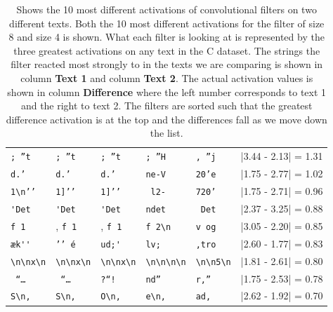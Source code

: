 \begin{table}
\begin{tabular}{lll|lll}
        \verb[; ”t[       & \verb[; ”t[       & \verb[; ”t[          &
        \verb'; ”H'       & \verb', ”j'       & |3.44 - 2.13| = 1.31 \\

        \verb[d.’ [       & \verb[d.’ [       & \verb[d.’ [          &
        \verb'ne-V'       & \verb'20’e'       & |1.75 - 2.77| = 1.02 \\

        \verb[1\n’’[      & \verb[1]’’[       & \verb[1]’’[          &
        \verb' l2-'       & \verb'720’'       & |1.75 - 2.71| = 0.96 \\

        \verb['Det[       & \verb['Det[       & \verb['Det[          &
        \verb'ndet'       & \verb' Det'       & |2.37 - 3.25| = 0.88 \\

        \verb[f 1[        &, \verb[f 1[       &, \verb[f 1[          &
        \verb'f 2\n'      & \verb'v og'       & |3.05 - 2.20| = 0.85 \\

        \verb[æk''[       & \verb[’’ é[       & \verb[ud;'[          &
        \verb'lv; '       & \verb',tro'       & |2.60 - 1.77| = 0.83 \\

        \verb[\n\nx\n[    & \verb[\n\nx\n[    & \verb[\n\nx\n[       &
        \verb'\n\n\n\n'   & \verb'\n\n5\n'    & |1.81 - 2.61| = 0.80 \\

        \verb[ “… [       & \verb[ “… [       & \verb[?“! [          &
        \verb'nd” '       & \verb'r,” '       & |1.75 - 2.53| = 0.78 \\

        \verb[S\n, [      & \verb[S\n, [      & \verb[O\n, [         &
        \verb'e\n, '      & \verb'ad, '       & |2.62 - 1.92| = 0.70 \\
    \end{tabular}
    \caption{Shows the 10 most different activations of convolutional filters on
        two different texts. Both the 10 most different activations for the
        filter of size 8 and size 4 is shown. What each filter is looking at is
        represented by the three greatest activations on any text in the \gls{C}
        dataset. The strings the filter reacted most strongly to in the texts we
        are comparing is shown in column \textbf{Text 1} and column \textbf{Text
        2}. The actual activation values is shown in column \textbf{Difference}
        where the left number corresponds to text 1 and the right to text 2. The
        filters are sorted such that the greatest difference activation is at
        the top and the differences fall as we move down the list.}
    \label{tab:teacher_feedback_output}
\end{table}

